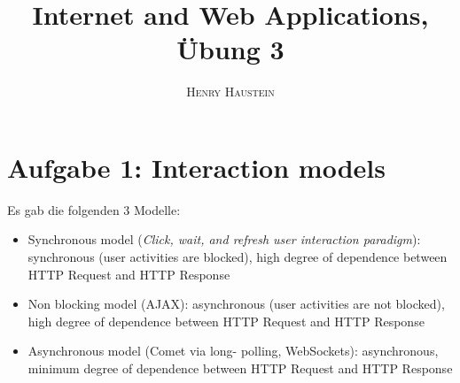 \documentclass{article}
\title{\textbf{Internet and Web Applications, Übung 3}}
\author{\textsc{Henry Haustein}}
\date{}
\begin{document}
	\maketitle
	
	\section*{Aufgabe 1: Interaction models}
	Es gab die folgenden 3 Modelle:
	\begin{itemize}
		\item Synchronous model (\textit{Click, wait, and refresh user interaction paradigm}): synchronous (user activities are blocked), high degree of dependence between HTTP Request and HTTP Response
		\item Non blocking model (AJAX): asynchronous (user activities are not blocked), high degree of dependence between HTTP Request and HTTP Response
		\item Asynchronous model (Comet via long- polling, WebSockets): asynchronous, minimum degree of dependence between HTTP Request and HTTP Response
	\end{itemize}
	
\end{document}
